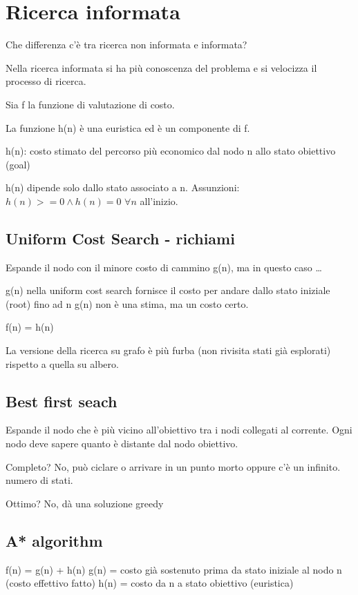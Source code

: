 \newpage

\section{Ricerca informata}

Che differenza c'è tra ricerca non informata e informata?

Nella ricerca informata si ha più conoscenza del problema e si
velocizza il processo di ricerca.

Sia f la funzione di valutazione di costo.

La funzione h(n) è una euristica ed è un componente di f.

h(n): costo stimato del percorso più economico dal nodo n allo stato
obiettivo (goal)

h(n) dipende solo dallo stato associato a n.
Assunzioni: $h(n) >= 0 \land h(n) = 0$ $\forall n$ all'inizio.

\subsection{Uniform Cost Search - richiami}
Espande il nodo con il minore costo di cammino g(n), ma in questo caso \dots

g(n) nella uniform cost search fornisce il costo per andare dallo stato
iniziale (root) fino ad n g(n) non è una stima, ma un costo certo.

f(n) = h(n)

La versione della ricerca su grafo è più furba (non rivisita stati già esplorati)
rispetto a quella su albero. 

\subsection{Best first seach}
Espande il nodo che è più vicino all'obiettivo tra i nodi collegati al corrente.
Ogni nodo deve sapere quanto è distante dal nodo obiettivo.

Completo? No, può ciclare o arrivare in un punto morto oppure c'è un infinito.
numero di stati.

Ottimo? No, dà una soluzione greedy

\subsection{A* algorithm}
f(n) = g(n) + h(n)
g(n) = costo già sostenuto prima da stato iniziale al nodo n (costo effettivo fatto)
h(n) = costo da n a stato obiettivo (euristica)

